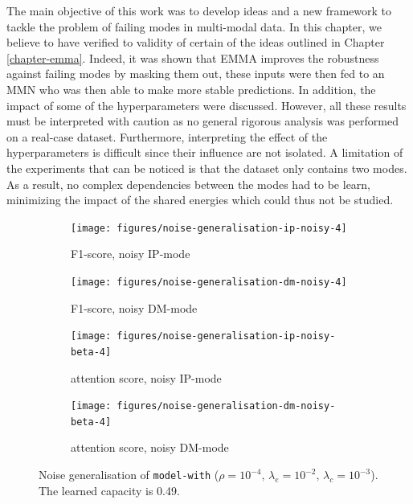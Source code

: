 The main objective of this work was to develop ideas and a new framework to tackle the problem of failing modes in multi-modal data. In this chapter, we believe to have verified to validity of certain of the ideas outlined in Chapter \ref{chapter-emma}. Indeed, it was shown that EMMA improves the robustness against failing modes by masking them out, these inputs were then fed to an MMN who was then able to make more stable predictions. In addition, the impact of some of the hyperparameters were discussed. However, all these results must be interpreted with caution as no general rigorous analysis was performed on a real-case dataset. Furthermore, interpreting the effect of the hyperparameters is difficult since their influence are not isolated. A limitation of the experiments that can be noticed is that the dataset only contains two modes. As a result, no complex dependencies between the modes had to be learn, minimizing the impact of the shared energies which could thus not be studied. 


\begin{figure}[!h]
\centering
\begin{subfigure}{.5\textwidth}
  \centering
  \texttt{[image: figures/noise-generalisation-ip-noisy-4]}
  \caption{F1-score, noisy IP-mode}
  \label{fig:exp-att-shift-7-a}
\end{subfigure}%
\begin{subfigure}{.5\textwidth}
  \centering
  \texttt{[image: figures/noise-generalisation-dm-noisy-4]}
  \caption{F1-score, noisy DM-mode}
  \label{fig:exp-att-shift-7-b}
\end{subfigure}
\begin{subfigure}{.5\textwidth}
  \centering
  \texttt{[image: figures/noise-generalisation-ip-noisy-beta-4]}
  \caption{attention score, noisy IP-mode}
  \label{fig:exp-att-shift-7-c}
\end{subfigure}%
\begin{subfigure}{.5\textwidth}
  \centering
  \texttt{[image: figures/noise-generalisation-dm-noisy-beta-4]}
  \caption{attention score, noisy DM-mode}
  \label{fig:exp-att-shift-7-d}
\end{subfigure}
\caption[Noise generalisation with more capacity]{Noise generalisation of \texttt{model-with} ($\rho=10^{-4},\,\lambda_e=10^{-2},\,\lambda_c=10^{-3}$). The learned capacity is 0.49.}
\label{fig:exp-att-shift-7}
\end{figure}

